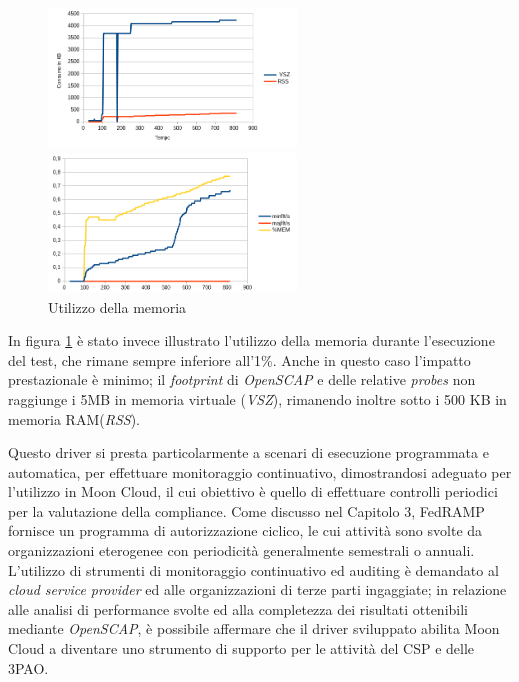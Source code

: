 \documentclass[../main.tex]{subfiles}
\begin{document}
\begin{figure}[H]
 \begin{minipage}[b]{6cm}
   \centering
   \includegraphics[width=6.6cm]{immagini/plot1mem.png}
 \end{minipage}
 \hspace{2mm} \hspace{3mm}
 \begin{minipage}[b]{9cm}
  \centering
   \includegraphics[width=6.6cm]{immagini/plot1mem2.png}
 \end{minipage}
 \caption{Utilizzo della memoria}\label{ref:plot1mem}
\end{figure}
In figura \ref{ref:plot1mem} è stato invece illustrato l'utilizzo della memoria durante l'esecuzione del test, che rimane sempre inferiore all'1\%. Anche in questo caso l'impatto prestazionale è minimo; il \textit{footprint} di \textit{OpenSCAP} e delle relative \textit{probes} non raggiunge i 5MB in memoria virtuale (\textit{VSZ}), rimanendo inoltre sotto i 500 KB in memoria RAM(\textit{RSS}).

Questo driver si presta particolarmente a scenari di esecuzione programmata e automatica, per effettuare monitoraggio continuativo, dimostrandosi adeguato per l'utilizzo in Moon Cloud, il cui obiettivo è quello di effettuare controlli periodici per la valutazione della compliance.
Come discusso nel Capitolo 3, FedRAMP fornisce un programma di autorizzazione ciclico, le cui attività sono svolte da organizzazioni eterogenee con periodicità generalmente semestrali o annuali. L'utilizzo di strumenti di monitoraggio continuativo ed auditing è demandato al \textit{cloud service provider} ed alle organizzazioni di terze parti ingaggiate; in relazione alle analisi di performance svolte ed alla completezza dei risultati ottenibili mediante \textit{OpenSCAP}, è possibile affermare che il driver sviluppato abilita Moon Cloud a diventare uno strumento di supporto per le attività del CSP e delle 3PAO.
\end{document}
